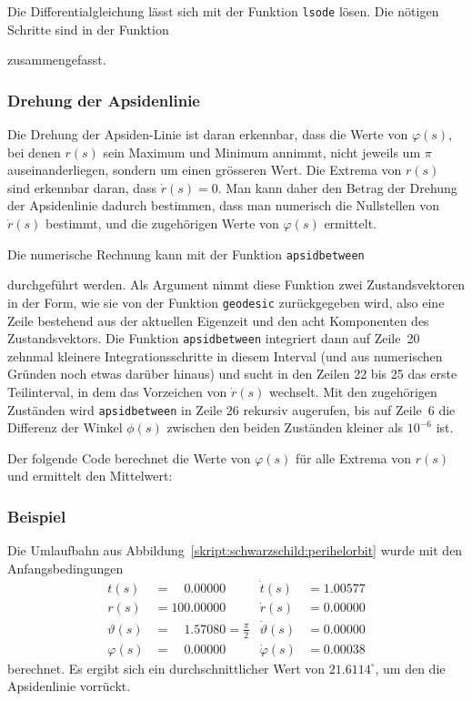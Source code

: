 Die Differentialgleichung lässt sich mit der Funktion \texttt{lsode}
lösen.
Die nötigen Schritte sind in der Funktion

zusammengefasst.

\subsubsection{Drehung der Apsidenlinie}
Die Drehung der Apsiden-Linie ist daran erkennbar, dass die Werte von
$\varphi(s)$, bei denen $r(s)$ sein Maximum und Minimum annimmt,
nicht jeweils um $\pi$ auseinanderliegen, sondern um einen grösseren
Wert.
Die Extrema von $r(s)$ sind erkennbar daran, dass $\dot r(s)=0$.
Man kann daher den Betrag der Drehung der Apsidenlinie dadurch
bestimmen, dass man numerisch die Nullstellen von $\dot r(s)$
bestimmt, und die zugehörigen Werte von $\varphi(s)$ ermittelt.

Die numerische Rechnung kann mit der Funktion \texttt{apsidbetween}

durchgeführt werden.
Als Argument nimmt diese Funktion zwei Zustandsvektoren in der Form,
wie sie von der Funktion \texttt{geodesic}
zurückgegeben wird, also eine Zeile bestehend aus der aktuellen
Eigenzeit und den acht Komponenten des Zustandsvektors.
Die Funktion \texttt{apsidbetween} integriert dann auf Zeile~20
zehnmal kleinere Integrationsschritte in diesem Interval (und aus numerischen
Gründen noch etwas darüber hinaus) und sucht in den Zeilen 22 bis 25
das
erste Teilinterval, in dem das Vorzeichen von $\dot r(s)$ wechselt.
Mit den zugehörigen Zuständen wird \texttt{apsidbetween}
in Zeile 26
rekursiv augerufen, bis auf Zeile~6 die Differenz der Winkel $\phi(s)$ zwischen
den beiden Zuständen kleiner als $10^{-6}$ ist.

Der folgende Code berechnet die Werte von $\varphi(s)$ für alle
Extrema von $r(s)$ und ermittelt den Mittelwert:


\subsubsection{Beispiel}
Die Umlaufbahn aus Abbildung~\ref{skript:schwarzschild:perihelorbit}
wurde mit den Anfangsbedingungen
\begin{equation}
\begin{aligned}
t(s)        &=\phantom{00}0.00000                    &\dot t(s)         &= 1.00577\\
r(s)        &=          100.00000                    &\dot r(s)         &= 0.00000\\
\vartheta(s)&=\phantom{00}1.57080=\textstyle\frac\pi2&\dot \vartheta(s) &= 0.00000\\
\varphi(s)  &=\phantom{00}0.00000                    &\dot \varphi(s)   &= 0.00038
\end{aligned}
\label{skript:schwarzschild:anfangsbedingung:normal}
\end{equation}
berechnet.
Es ergibt sich ein durchschnittlicher Wert von $21.6114^\circ$, um den die
Apsidenlinie vorrückt.

